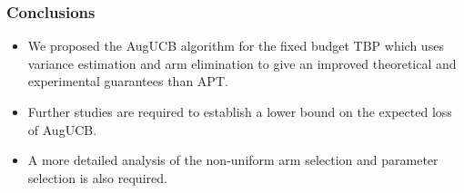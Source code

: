 \begin{frame}
\frametitle{Conclusions}
\begin{itemize}
\item<1-> We proposed the AugUCB algorithm for the fixed budget TBP  which uses variance estimation and arm elimination to give an improved theoretical and experimental guarantees than APT.
\item<2-> Further studies are required to establish a lower bound on the expected loss of AugUCB.
\item<3-> A more detailed analysis of the non-uniform arm selection and parameter selection is also required.
\end{itemize}
\end{frame}


%
